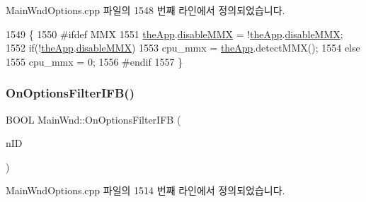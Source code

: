 Main\+Wnd\+Options.\+cpp 파일의 1548 번째 라인에서 정의되었습니다.


\begin{DoxyCode}
1549 \{
1550 \textcolor{preprocessor}{#ifdef MMX}
1551   \mbox{\hyperlink{_v_b_a_8cpp_a8095a9d06b37a7efe3723f3218ad8fb3}{theApp}}.\mbox{\hyperlink{class_v_b_a_ac417f46c467d0fcf095731620ca7de71}{disableMMX}} = !\mbox{\hyperlink{_v_b_a_8cpp_a8095a9d06b37a7efe3723f3218ad8fb3}{theApp}}.\mbox{\hyperlink{class_v_b_a_ac417f46c467d0fcf095731620ca7de71}{disableMMX}};
1552   \textcolor{keywordflow}{if}(!\mbox{\hyperlink{_v_b_a_8cpp_a8095a9d06b37a7efe3723f3218ad8fb3}{theApp}}.\mbox{\hyperlink{class_v_b_a_ac417f46c467d0fcf095731620ca7de71}{disableMMX}})
1553     cpu\_mmx = \mbox{\hyperlink{_v_b_a_8cpp_a8095a9d06b37a7efe3723f3218ad8fb3}{theApp}}.detectMMX();
1554   \textcolor{keywordflow}{else}
1555     cpu\_mmx = 0;
1556 \textcolor{preprocessor}{#endif}
1557 \}
\end{DoxyCode}
\mbox{\label{class_main_wnd_ac08824702182bf311a093c5aa39936ef}} 
\subsubsection{\texorpdfstring{On\+Options\+Filter\+I\+F\+B()}{OnOptionsFilterIFB()}}
{\footnotesize\ttfamily B\+O\+OL Main\+Wnd\+::\+On\+Options\+Filter\+I\+FB (\begin{DoxyParamCaption}\item[{U\+I\+NT}]{n\+ID }\end{DoxyParamCaption})}



Main\+Wnd\+Options.\+cpp 파일의 1514 번째 라인에서 정의되었습니다.


